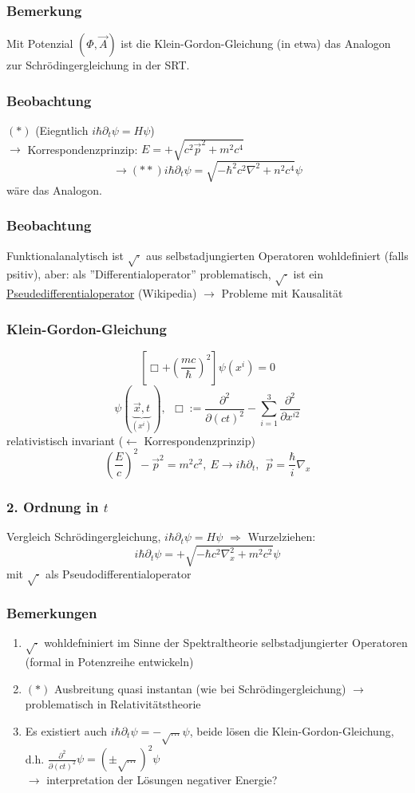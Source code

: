 \documentclass[twoside,a4paper]{scrartcl}
\renewcommand{\1}{\mathds{1}}
\newcommand{\Ra}{\Rightarrow}
\newcommand{\ra}{\rightarrow}
\newcommand{\la}{\leftarrow}
\begin{document}
\subsubsection*{Bemerkung}
Mit Potenzial $(\Phi,\vec A)$ ist die Klein-Gordon-Gleichung (in etwa) das Analogon zur Schrödingergleichung in der SRT.
\subsubsection*{Beobachtung}
$(*)$ (Eiegntlich $i\hbar \partial_t \psi=H\psi$)\\
$\ra$ Korrespondenzprinzip: $E=+\sqrt{c^2\vec p^2+m^2c^4}$
$$\ra (**) i\hbar \partial_t \psi= \sqrt{-\hbar^2c^2\nabla^2+n^2c^4}\psi $$
wäre das Analogon.
\subsubsection*{Beobachtung}
Funktionalanalytisch ist $\sqrt{\cdot}$ aus selbstadjungierten Operatoren wohldefiniert (falls psitiv), aber:
als ''Differentialoperator'' problematisch, $\sqrt{\cdot}$ ist ein \underline{Pseudedifferentialoperator} (Wikipedia) $\ra$ Probleme mit Kausalität

% 

\subsubsection*{Klein-Gordon-Gleichung}
$$[\Box+(\frac{mc}{\hbar})^2] \psi(x^i)=0$$
$$\psi(\underbrace{\vec x,t}_{(x^i)}), \ \ \Box:=\frac{\partial^2}{\partial (ct)^2}-\sum_{i=1}^3 \frac{\partial^2}{\partial x^{i2}}$$
relativistisch invariant ($\la$ Korrespondenzprinzip)
$$(\frac{E}{c})^2-\vec p^2=m^2c^2, \ E \ra i\hbar \partial_t, \ \ \vec p=\frac{\hbar}{i}\nabla_x$$
\subsubsection*{2. Ordnung in $t$}
Vergleich Schrödingergleichung, $i\hbar \partial_t \psi=H\psi$ $\Ra$ Wurzelziehen:
$$i\hbar \partial_t \psi=+\sqrt{-\hbar c^2 \nabla_x^2+m^2c^2}\psi$$
mit $\sqrt{\cdot}$ als Pseudodifferentialoperator
\subsubsection*{Bemerkungen}
\begin{enumerate}
\item $\sqrt{\cdot}$ wohldefniniert im Sinne der Spektraltheorie selbstadjungierter Operatoren (formal in Potenzreihe entwickeln)
\item $(*)$ Ausbreitung quasi instantan (wie bei Schrödingergleichung) $\ra$ problematisch in Relativitätstheorie
\item Es existiert auch $i\hbar \partial_t \psi=-\sqrt{...}\psi$, beide lösen die Klein-Gordon-Gleichung, d.h. $\frac{\partial^2}{\partial (ct)^2}\psi=(\pm \sqrt{...})^2 \psi$\\
$\ra$ interpretation der Lösungen negativer Energie?
\end{enumerate}
\end{document}

